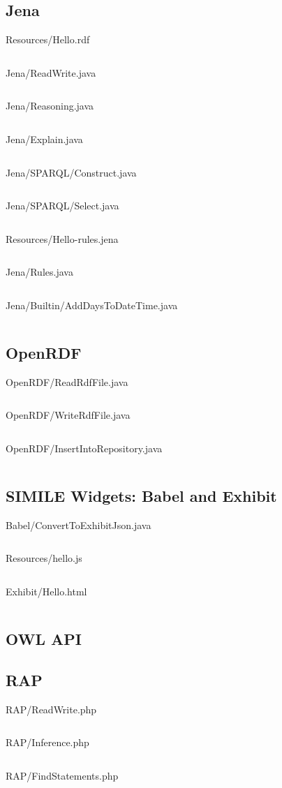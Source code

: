 \documentclass[xcolor=dvipsnames]{beamer}
\begin{document}
\newcommand{\sourcesFontSize}{\tiny}
\newcommand{\source}[3]{
\begin{frame}{#3.#1}
\vspace{-5mm}
\begin{center}
\inputminted[fontsize=\sourcesFontSize, frame=lines, tabsize=3]{#1}{src/#1/#2/#3.#1}
\end{center}
\end{frame}
}

\newcommand{\java}[1]{\source{java}{mi_swe}{#1}}

\newcommand{\resource}[2]{
\begin{frame}{Resources/#2}
\vspace{-5mm}
\inputminted[fontsize=\sourcesFontSize, frame=lines, tabsize=3]{#1}{src/resources/#2}
\end{frame}
}

 
\subsection{Jena}
\frame{\tableofcontents[currentsubsection]}
 
\resource{turtle}{Hello.rdf}
\java{Jena/ReadWrite}
\java{Jena/Reasoning}
\java{Jena/Explain}
\java{Jena/SPARQL/Construct}
\java{Jena/SPARQL/Select}

\resource{jena}{Hello-rules.jena}
\java{Jena/Rules}
\java{Jena/Builtin/AddDaysToDateTime}

\subsection{OpenRDF} 
\frame{\tableofcontents[currentsubsection]}
\java{OpenRDF/ReadRdfFile}
\java{OpenRDF/WriteRdfFile}
\java{OpenRDF/InsertIntoRepository}

\subsection{SIMILE Widgets: Babel and Exhibit} 
\frame{\tableofcontents[currentsubsection]}

\java{Babel/ConvertToExhibitJson}
\resource{js}{hello.js}
\source{html}{}{Exhibit/Hello}

\subsection{OWL API} 
\frame{\tableofcontents[currentsubsection]}

\subsection{RAP} 
\frame{\tableofcontents[currentsubsection]}
\source{php}{}{RAP/ReadWrite}
\source{php}{}{RAP/Inference}
\source{php}{}{RAP/FindStatements}
\end{document}
